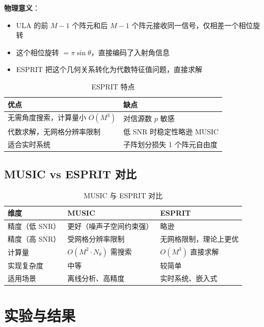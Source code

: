 \documentclass[11pt,a4paper]{article}
\begin{document}
\textbf{物理意义}：
\begin{itemize}
    \item ULA 的前 $M-1$ 个阵元和后 $M-1$ 个阵元接收同一信号，仅相差一个相位旋转
    \item 这个相位旋转 $= \pi\sin\theta$，直接编码了入射角信息
    \item ESPRIT 把这个几何关系转化为代数特征值问题，直接求解
\end{itemize}

\begin{table}[H]
\centering
\caption{ESPRIT 特点}
\begin{tabular}{p{6cm}p{6cm}}
\toprule
\textbf{优点} & \textbf{缺点} \\
\midrule
无需角度搜索，计算量小 $O(M^3)$ & 对信源数 $p$ 敏感 \\
代数求解，无网格分辨率限制 & 低 SNR 时稳定性略逊 MUSIC \\
适合实时系统 & 子阵划分损失 1 个阵元自由度 \\
\bottomrule
\end{tabular}
\end{table}

\subsection{MUSIC vs ESPRIT 对比}

\begin{table}[H]
\centering
\caption{MUSIC 与 ESPRIT 对比}
\label{tab:music_vs_esprit}
\begin{tabular}{lll}
\toprule
\textbf{维度} & \textbf{MUSIC} & \textbf{ESPRIT} \\
\midrule
精度（低 SNR） & 更好（噪声子空间约束强） & 略逊 \\
精度（高 SNR） & 受网格分辨率限制 & 无网格限制，理论上更优 \\
计算量 & $O(M^2 \cdot N_\theta)$ 需搜索 & $O(M^3)$ 直接求解 \\
实现复杂度 & 中等 & 较简单 \\
适用场景 & 离线分析、高精度 & 实时系统、嵌入式 \\
\bottomrule
\end{tabular}
\end{table}

\section{实验与结果}
\end{document}
